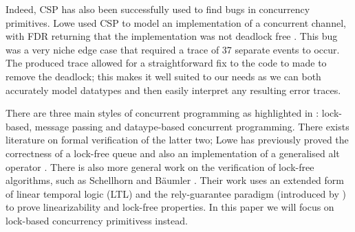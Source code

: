 Indeed, CSP has also been successfully used to find bugs in concurrency primitives. Lowe used CSP to model an implementation of a concurrent channel, with FDR returning that the implementation was not deadlock free \cite{LoweDeadlock}. This bug was a very niche edge case that required a trace of 37 separate events to occur. The produced trace allowed for a straightforward fix to the code to made to remove the deadlock; this makes it well suited to our needs as we can both accurately model datatypes and then easily interpret any resulting error traces.

There are three main styles of concurrent programming as highlighted in \cite{CADS}: lock-based, message passing and dataype-based concurrent programming. There exists literature on formal verification of the latter two; Lowe has previously proved the correctness of a lock-free queue\cite{LFQueue} and also an implementation of a generalised alt operator \cite{LoweAlt}. There is also more general work on the verification of lock-free algorithms, such as Schellhorn and B{\"a}umler \cite{Schellhorn}. Their work uses an extended form of linear temporal logic (LTL) and the rely-guarantee paradigm (introduced by \cite{Jones}) to prove linearizability and lock-free properties. 
In this paper we will focus on lock-based concurrency primitivess instead. 





